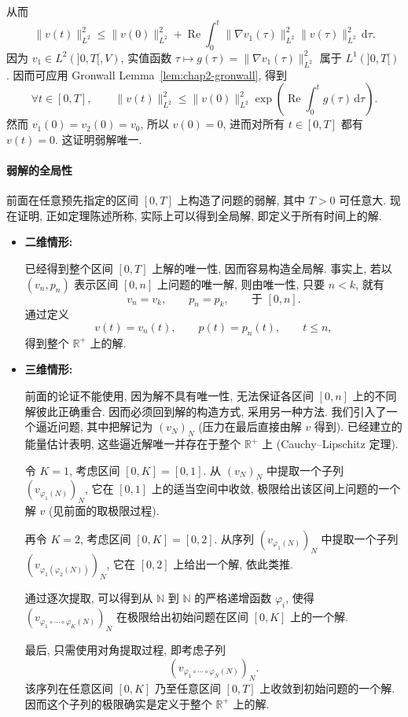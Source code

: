 从而
\[
 \|v(t)\|_{L^2}^2
 \leq\|v(0)\|_{L^2}^2
 +\operatorname{Re}\int_0^t\|\nabla v_1(\tau)\|_{L^2}^2\|v(\tau)\|_{L^2}^2\,\mathrm d\tau.
\]
因为 $v_1\in L^2(]0,T[,V)$, 实值函数 $\tau\mapsto g(\tau)=\|\nabla v_1(\tau)\|_{L^2}^2$ 属于 $L^1(]0,T[)$. 因而可应用 Gronwall Lemma~\ref{lem:chap2-gronwall}, 得到
\[
 \forall t\in[0,T],\qquad
 \|v(t)\|_{L^2}^2\leq\|v(0)\|_{L^2}^2
 \exp\left(\operatorname{Re}\int_0^tg(\tau)\,\mathrm d\tau\right).
\]
然而 $v_1(0)=v_2(0)=v_0$, 所以 $v(0)=0$, 进而对所有 $t\in[0,T]$ 都有 $v(t)=0$. 这证明弱解唯一.

\paragraph{弱解的全局性}

前面在任意预先指定的区间 $[0,T]$ 上构造了问题的弱解, 其中 $T>0$ 可任意大. 现在证明, 正如定理陈述所称, 实际上可以得到全局解, 即定义于所有时间上的解.

\begin{itemize}
 \item \textbf{二维情形:}

 已经得到整个区间 $[0,T]$ 上解的唯一性, 因而容易构造全局解. 事实上, 若以 $(v_n,p_n)$ 表示区间 $[0,n]$ 上问题的唯一解, 则由唯一性, 只要 $n<k$, 就有
 \[
  v_n=v_k,\qquad p_n=p_k,\qquad\text{于 }[0,n].
 \]
 通过定义
 \[
  v(t)=v_n(t),\qquad p(t)=p_n(t),\qquad t\leq n,
 \]
 得到整个 $\mathbb R^+$ 上的解.

 \item \textbf{三维情形:}

 前面的论证不能使用, 因为解不具有唯一性, 无法保证各区间 $[0,n]$ 上的不同解彼此正确重合. 因而必须回到解的构造方式, 采用另一种方法. 我们引入了一个逼近问题, 其中把解记为 $(v_N)_N$ (压力在最后直接由解 $v$ 得到). 已经建立的能量估计表明, 这些逼近解唯一并存在于整个 $\mathbb R^+$ 上 (Cauchy--Lipschitz 定理).

 令 $K=1$, 考虑区间 $[0,K]=[0,1]$. 从 $(v_N)_N$ 中提取一个子列 $(v_{\varphi_1(N)})_N$, 它在 $[0,1]$ 上的适当空间中收敛, 极限给出该区间上问题的一个解 $v$ (见前面的取极限过程).

 再令 $K=2$, 考虑区间 $[0,K]=[0,2]$. 从序列 $(v_{\varphi_1(N)})_N$ 中提取一个子列 $(v_{\varphi_1(\varphi_2(N))})_N$, 它在 $[0,2]$ 上给出一个解, 依此类推.

 通过逐次提取, 可以得到从 $\mathbb N$ 到 $\mathbb N$ 的严格递增函数 $\varphi_i$, 使得 $(v_{\varphi_1\circ\cdots\circ\varphi_K(N)})_N$ 在极限给出初始问题在区间 $[0,K]$ 上的一个解.

 最后, 只需使用对角提取过程, 即考虑子列
 \[
  (v_{\varphi_1\circ\cdots\circ\varphi_N(N)})_N.
 \]
 该序列在任意区间 $[0,K]$ 乃至任意区间 $[0,T]$ 上收敛到初始问题的一个解. 因而这个子列的极限确实是定义于整个 $\mathbb R^+$ 上的解.
\end{itemize}

